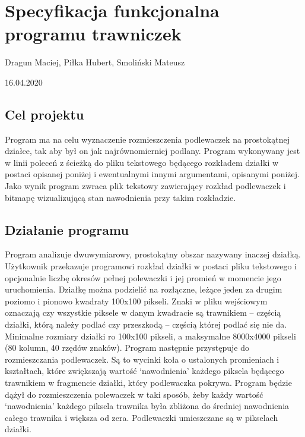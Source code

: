 \documentclass[12pt]{article}
\renewcommand{\_}{\kern-1.5pt\textunderscore\kern-1.5pt}
\begin{document}
\section*{Specyfikacja funkcjonalna programu trawniczek}
\begin{Center}
Dragun Maciej, Piłka Hubert, Smoliński Mateusz
\end{Center}\par

\begin{Center}
16.04.2020
\end{Center}\par


\vspace{\baselineskip}
\subsection*{Cel projektu}
Program ma na celu wyznaczenie rozmieszczenia podlewaczek na prostokątnej działce, tak aby był on jak najrównomierniej podlany. Program wykonywany jest w linii poleceń z ścieżką do pliku tekstowego będącego rozkładem działki w postaci opisanej poniżej i ewentualnymi innymi argumentami, opisanymi poniżej. Jako wynik program zwraca plik tekstowy zawierający rozkład podlewaczek i bitmapę wizualizującą stan nawodnienia przy takim rozkładzie.\par

\subsection*{Działanie programu}
Program analizuje dwuwymiarowy, prostokątny obszar nazywany inaczej działką. Użytkownik przekazuje programowi rozkład działki w postaci pliku tekstowego i opcjonalnie liczbę okresów pełnej polewaczki i jej promień w momencie jego uruchomienia. Działkę można podzielić na rozłączne, leżące jeden za drugim poziomo i pionowo kwadraty 100x100 pikseli. Znaki w pliku wejściowym oznaczają czy wszystkie piksele w danym kwadracie są trawnikiem – częścią działki, którą należy podlać czy przeszkodą – częścią której podlać się nie da. Minimalne rozmiary działki ro 100x100 pikseli, a maksymalne 8000x4000 pikseli (80 kolumn, 40 rzędów znaków). Program następnie przystępuje do rozmieszczania podlewaczek. Są to wycinki koła o ustalonych promieniach i kształtach, które zwiększają wartość ‘nawodnienia’ każdego piksela będącego trawnikiem w fragmencie działki, który podlewaczka pokrywa. Program będzie dążył do rozmieszczenia polewaczek w taki sposób, żeby każdy wartość ‘nawodnienia’ każdego piksela trawnika była zbliżona do średniej nawodnienia całego trawnika i większa od zera. Podlewaczki umieszczane są w pikselach działki.\par
\end{document}
